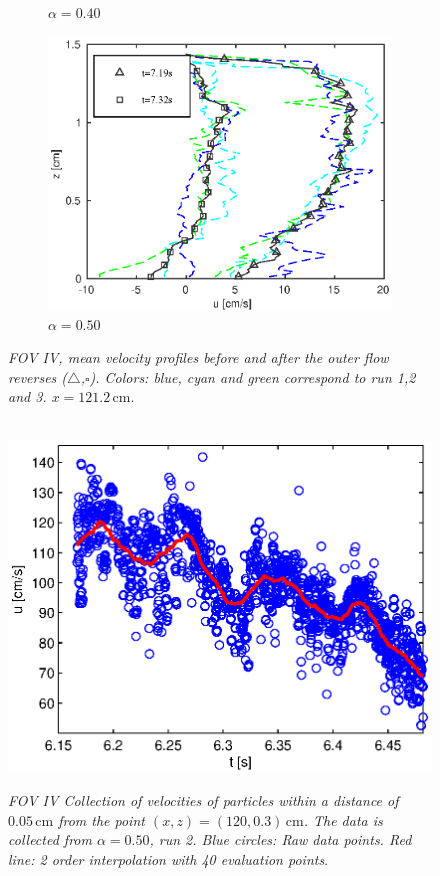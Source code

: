 \documentclass[review, authoryear]{elsarticle}
\newcommand{\cm}{\,\mbox{cm}}
\begin{document}
\begin{figure}[]
{\begin{subfigure}[b]{.3\textwidth}
\caption{\textit{$\alpha=0.40$}}
\end{subfigure}%
\begin{subfigure}[b]{.3\textwidth}
\centering
\includegraphics[width=.95\textwidth]{./Figures/FOV_6/PIV_FOV6_case50.eps}
\caption{\textit{$\alpha=0.50$}}
\end{subfigure}%
}
\caption{\textit{FOV IV, mean velocity profiles before and after the outer flow reverses ($\triangle$,$\square$). Colors: blue, cyan and green correspond to run 1,2 and 3. 
$x=121.2\cm$}. }
\label{fig:PIV_FOV6}
\end{figure}
\begin{figure}[]
        \centering
        ~ %
                \includegraphics[scale=0.6]{./Figures/tid_case50_run2.eps}
                \caption{\textit{FOV IV Collection of velocities of particles within a distance of $0.05\cm$ from the point $(x,z)=(120,0.3)\cm$. The data is collected from  $\alpha=0.50$, run 2. Blue circles: Raw data points. Red line: 2 order interpolation with 40 evaluation points}.}
                \label{fig:wave_in_time}
        \end{figure}      
\end{document}
